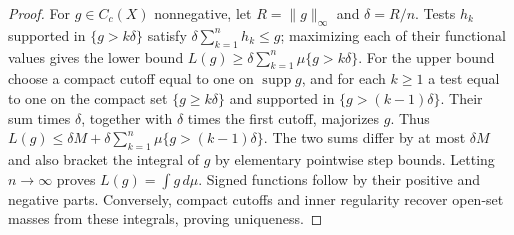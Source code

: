 \begin{proof}
For $g\in C_c(X)$ nonnegative, let $R=\|g\|_\infty$ and $\delta=R/n$.
Tests $h_k$ supported in $\{g>k\delta\}$ satisfy
$\delta\sum_{k=1}^n h_k\leq g$; maximizing each of their functional
values gives the lower bound
$L(g)\geq\delta\sum_{k=1}^n\mu\{g>k\delta\}$.
For the upper bound choose a compact cutoff equal to one on
$\operatorname{supp}g$, and for each $k\geq1$ a test equal to one
on the compact set $\{g\geq k\delta\}$ and supported in
$\{g>(k-1)\delta\}$. Their sum times $\delta$, together with
$\delta$ times the first cutoff, majorizes $g$.
Thus
$L(g)\leq\delta M+\delta\sum_{k=1}^n\mu\{g>(k-1)\delta\}$.
The two sums differ by at most $\delta M$ and also bracket the integral
of $g$ by elementary pointwise step bounds. Letting $n\to\infty$
proves $L(g)=\int g\,d\mu$. Signed functions follow by their positive
and negative parts. Conversely, compact cutoffs and inner regularity
recover open-set masses from these integrals, proving uniqueness.
\end{proof}

